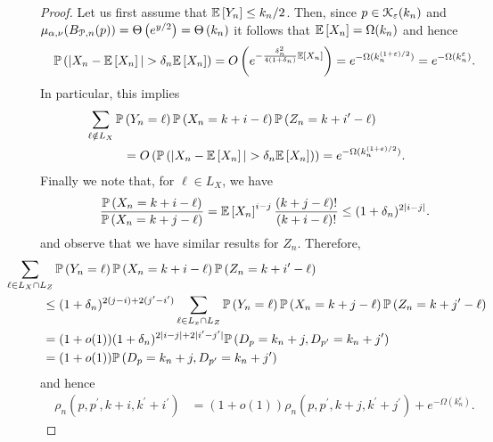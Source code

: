 \begin{proof}
Let us first assume that $\mathbb{E}\left[Y_n\right] \le k_n/2$. Then, since $p \in {\mathcal K}_{\varepsilon}(k_n)$ and $\mu_{\alpha,\nu}(B_{{\mathcal P},n}(p)) = \Theta\left(e^{y/2}\right) = \Theta\left(k_n\right)$ it follows that $\mathbb{E}\left[X_n\right] = \Omega(k_n)$ and hence
\[
	\mathbb{P}\left(|X_n - \mathbb{E}\left[X_n\right]| > \delta_n \mathbb{E}\left[X_n\right]\right) = O\left(e^{-\frac{\delta_n^2}{4(1+\delta_n)} \mathbb{E}\left[X_n\right]}\right) = e^{-\Omega(k_n^{(1+\varepsilon)/2})} = e^{-\Omega(k_n^{\varepsilon})}.
\]
In particular, this implies
\begin{align*}
	&\hspace{-30pt}\sum_{\ell \notin L_X} \Prob{Y_n = \ell} \Prob{X_n = k + i - \ell} 
			\Prob{Z_n = k + i^\prime - \ell}\\
	&= \bigO{\Prob{|X_n - \Exp{X_n}| > \delta_n \Exp{X_n}}} = e^{-\Omega(k_n^{(1+\varepsilon)/2})}.
\end{align*}
Finally we note that, for $\ell \in L_X$, we have
\begin{equation}\label{eq:fraction_degree_prob}
	\frac{\mathbb{P}\left(X_n = k + i - \ell\right)}{\mathbb{P}\left(X_n = k + j - \ell\right)} = \mathbb{E}\left[X_n\right]^{i - j} \frac{(k + j - \ell)!}{(k + i - \ell)!}
	\le (1 + \delta_n)^{2|i - j|}.
\end{equation}
and observe that we have similar results for $Z_n$. Therefore,
\begin{align*}
	&\hspace{-30pt}\sum_{\ell \in L_X \cap L_Z} \Prob{Y_n = \ell} \Prob{X_n = k + i - \ell} 
		\Prob{Z_n = k + i^\prime - \ell} \\
	&\le (1+\delta_n)^{2(j-i) + 2(j^\prime - i^\prime)} \sum_{\ell \in L_x \cap L_Z} 
			\Prob{Y_n = \ell} \Prob{X_n = k + j - \ell} \Prob{Z_n = k + j^\prime - \ell}\\
	&= (1+o(1))(1+\delta_n)^{2|i-j| + 2|i^\prime - j^\prime|}\Prob{D_p = k_n + j, D_{p^\prime} = k_n + j^\prime}\\
	&= (1+o(1))\Prob{D_p = k_n + j, D_{p^\prime} = k_n + j^\prime}
\end{align*}
and hence
\begin{align*}
	\rho_n(p,p^\prime,k+i,k^\prime+i^\prime)
	&= (1+o(1))\rho_n(p,p^\prime,k+j,k^\prime+j^\prime) + e^{-\Omega(k_n^\varepsilon)}.
\end{align*}


\end{proof}
